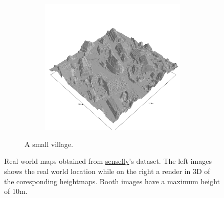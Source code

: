 \documentclass[../document.tex]{subfiles}
\begin{document}
\begin{figure}[htbp]
\begin{subfigure}[b]{1\textwidth}
\begin{subfigure}[b]{0.45\textwidth}
    \end{subfigure}  
    \begin{subfigure}[b]{0.45\textwidth}
        \includegraphics[width=\textwidth]{../img/hm3d_borders/sullens.png}
    \end{subfigure} 
    \caption{A small village.} 
\end{subfigure}
\caption{Real world maps obtained from \href{https://www.sensefly.com/education/datasets/}{sensefly}'s dataset. The left images shows the real world location while on the right a render in 3D of the coresponding heightmaps. Booth images have a maximum height of 10m.}  
\label{fig : real-maps}
\end{figure}
\end{document}

